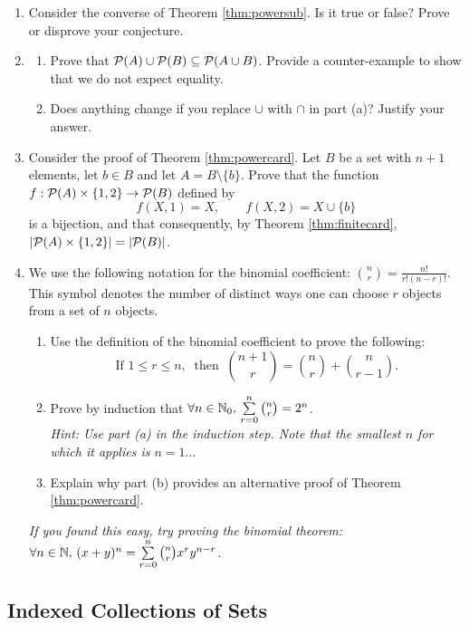 \begin{exercises}{}{}
\begin{enumerate}
	\item\label{ex:powersub2} Consider the converse of Theorem \ref{thm:powersub}. Is it true or false? Prove or disprove your conjecture.
	
	\item\begin{enumerate}
	  \item Prove that $\mathcal{P}(A)\cup\mathcal{P}(B)\subseteq\mathcal{P}(A\cup B)$. Provide a counter-example to show that we do not expect equality.
	  \item Does anything change if you replace $\cup$ with $\cap$ in part (a)? Justify your answer.
	\end{enumerate}
	
	\item Consider the proof of Theorem \ref{thm:powercard}. Let $B$ be a set with $n+1$ elements, let $b\in B$ and let $A=B\setminus\{b\}$. Prove that the function $f:\mathcal{P}(A)\times\{1,2\}\to\mathcal{P}(B)$ defined by
	\[f(X,1)=X,\qquad f(X,2)=X\cup\{b\}\]
	is a bijection, and that consequently, by Theorem \ref{thm:finitecard}, $\left| \mathcal{P}(A)\times\{1,2\}\right|=\left| \mathcal{P}(B)\right|$.
	
	\item\label{ex:binom} We use the following notation for the binomial coefficient: $\binom nr=\frac{n!}{r!(n-r)!}$. This symbol denotes the number of distinct ways one can choose $r$ objects from a set of $n$ objects.
	\begin{enumerate}
	  \item Use the definition of the binomial coefficient to prove the following:
	  \[\text{If } 1\le r\le n,\ \text{ then }\ \binom{n+1}r=\binom nr+\binom n{r-1}.\]
		\item Prove by induction that $\forall n\in\mathbb{N}_0,\,\sum\limits_{r=0}^n\binom nr=2^n$.\\
		\emph{Hint: Use part (a) in the induction step. Note that the smallest $n$ for which it applies is $n=1\ldots$}
		\item Explain why part (b) provides an alternative proof of Theorem \ref{thm:powercard}.
	\end{enumerate}
	\emph{If you found this easy, try proving the binomial theorem: $\forall n\in\mathbb{N},\,(x+y)^n=\sum\limits_{r=0}^n\binom nrx^ry^{n-r}$.}
\end{enumerate}

\end{exercises}


\clearpage



\subsection{Indexed Collections of Sets}

